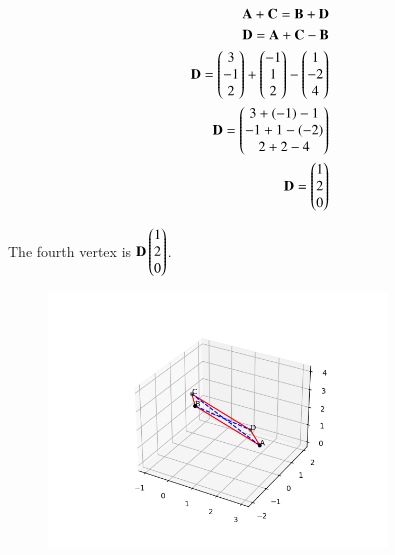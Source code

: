 \documentclass[journal]{IEEEtran}
\begin{document}
\begin{align}
     \mathbf{A} + \mathbf{C} = \mathbf{B} + \mathbf{D}  \\
     \mathbf{D} = \mathbf{A} + \mathbf{C} - \mathbf{B}  \\
     \mathbf{D} = \begin{pmatrix}3\\-1\\2\end{pmatrix} + \begin{pmatrix}-1\\1\\2\end{pmatrix}  - \begin{pmatrix}1\\-2\\4\end{pmatrix}  \\
     \mathbf{D} = \begin{pmatrix}3+(-1)-1 \\ -1+1-(-2) \\ 2+2-4\end{pmatrix}  \\
     \mathbf{D} = \begin{pmatrix}1\\2\\0\end{pmatrix}
\end{align}

The fourth vertex is $\mathbf{D}\begin{pmatrix}1\\2\\0\end{pmatrix}$.

\begin{figure}[H]
    \centering
    \includegraphics[width=0.8\textwidth]{figs/Fig 1.png}
    \caption{}
    \label{fig:Parallelogram}
\end{figure}
\end{document}
